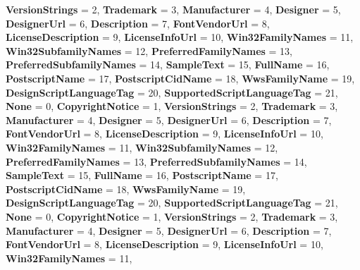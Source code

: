 \begin{DoxyCompactItemize}
{\bfseries Version\+Strings} = 2, 
{\bfseries Trademark} = 3, 
\newline
{\bfseries Manufacturer} = 4, 
{\bfseries Designer} = 5, 
{\bfseries Designer\+Url} = 6, 
{\bfseries Description} = 7, 
\newline
{\bfseries Font\+Vendor\+Url} = 8, 
{\bfseries License\+Description} = 9, 
{\bfseries License\+Info\+Url} = 10, 
{\bfseries Win32\+Family\+Names} = 11, 
\newline
{\bfseries Win32\+Subfamily\+Names} = 12, 
{\bfseries Preferred\+Family\+Names} = 13, 
{\bfseries Preferred\+Subfamily\+Names} = 14, 
{\bfseries Sample\+Text} = 15, 
\newline
{\bfseries Full\+Name} = 16, 
{\bfseries Postscript\+Name} = 17, 
{\bfseries Postscript\+Cid\+Name} = 18, 
{\bfseries Wws\+Family\+Name} = 19, 
\newline
{\bfseries Design\+Script\+Language\+Tag} = 20, 
{\bfseries Supported\+Script\+Language\+Tag} = 21, 
{\bfseries None} = 0, 
{\bfseries Copyright\+Notice} = 1, 
\newline
{\bfseries Version\+Strings} = 2, 
{\bfseries Trademark} = 3, 
{\bfseries Manufacturer} = 4, 
{\bfseries Designer} = 5, 
\newline
{\bfseries Designer\+Url} = 6, 
{\bfseries Description} = 7, 
{\bfseries Font\+Vendor\+Url} = 8, 
{\bfseries License\+Description} = 9, 
\newline
{\bfseries License\+Info\+Url} = 10, 
{\bfseries Win32\+Family\+Names} = 11, 
{\bfseries Win32\+Subfamily\+Names} = 12, 
{\bfseries Preferred\+Family\+Names} = 13, 
\newline
{\bfseries Preferred\+Subfamily\+Names} = 14, 
{\bfseries Sample\+Text} = 15, 
{\bfseries Full\+Name} = 16, 
{\bfseries Postscript\+Name} = 17, 
\newline
{\bfseries Postscript\+Cid\+Name} = 18, 
{\bfseries Wws\+Family\+Name} = 19, 
{\bfseries Design\+Script\+Language\+Tag} = 20, 
{\bfseries Supported\+Script\+Language\+Tag} = 21, 
\newline
{\bfseries None} = 0, 
{\bfseries Copyright\+Notice} = 1, 
{\bfseries Version\+Strings} = 2, 
{\bfseries Trademark} = 3, 
\newline
{\bfseries Manufacturer} = 4, 
{\bfseries Designer} = 5, 
{\bfseries Designer\+Url} = 6, 
{\bfseries Description} = 7, 
\newline
{\bfseries Font\+Vendor\+Url} = 8, 
{\bfseries License\+Description} = 9, 
{\bfseries License\+Info\+Url} = 10, 
{\bfseries Win32\+Family\+Names} = 11, 
\newline

\end{DoxyCompactItemize}
